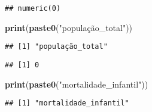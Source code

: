 \documentclass[
]{article}
\newenvironment{Shaded}{\begin{snugshade}}{\end{snugshade}}
\newcommand{\AttributeTok}[1]{\textcolor[rgb]{0.13,0.29,0.53}{#1}}
\newcommand{\DecValTok}[1]{\textcolor[rgb]{0.00,0.00,0.81}{#1}}
\newcommand{\FunctionTok}[1]{\textcolor[rgb]{0.13,0.29,0.53}{\textbf{#1}}}
\newcommand{\NormalTok}[1]{#1}
\newcommand{\OtherTok}[1]{\textcolor[rgb]{0.56,0.35,0.01}{#1}}
\newcommand{\SpecialCharTok}[1]{\textcolor[rgb]{0.81,0.36,0.00}{\textbf{#1}}}
\newcommand{\StringTok}[1]{\textcolor[rgb]{0.31,0.60,0.02}{#1}}
\begin{document}
\begin{verbatim}
## numeric(0)
\end{verbatim}

\begin{Shaded}
\begin{Highlighting}[]
\FunctionTok{print}\NormalTok{(}\FunctionTok{paste0}\NormalTok{(}\StringTok{"população\_total"}\NormalTok{))}
\end{Highlighting}
\end{Shaded}

\begin{verbatim}
## [1] "população_total"
\end{verbatim}

\begin{Shaded}
\end{Shaded}

\begin{verbatim}
## [1] 0
\end{verbatim}

\begin{Shaded}
\begin{Highlighting}[]
\FunctionTok{print}\NormalTok{(}\FunctionTok{paste0}\NormalTok{(}\StringTok{"mortalidade\_infantil"}\NormalTok{))}
\end{Highlighting}
\end{Shaded}

\begin{verbatim}
## [1] "mortalidade_infantil"
\end{verbatim}
\end{document}
